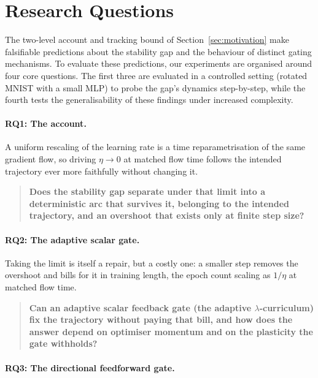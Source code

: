 \section{Research Questions}
\label{sec:research_questions}

The two-level account and tracking bound of Section~\ref{sec:motivation} make falsifiable predictions about the stability gap and the behaviour of distinct gating mechanisms. To evaluate these predictions, our experiments are organised around four core questions. The first three are evaluated in a controlled setting (rotated MNIST with a small MLP) to probe the gap's dynamics step-by-step, while the fourth tests the generalisability of these findings under increased complexity.

\paragraph{RQ1: The account.}
A uniform rescaling of the learning rate is a time reparametrisation of the same gradient flow, so driving $\eta \to 0$ at matched flow time follows the intended trajectory ever more faithfully without changing it.

\begin{quote}
    \textbf{Does the stability gap separate under that limit into a deterministic arc that survives it, belonging to the intended trajectory, and an overshoot that exists only at finite step size?}
\end{quote}

\paragraph{RQ2: The adaptive scalar gate.}
Taking the limit is itself a repair, but a costly one: a smaller step removes the overshoot and bills for it in training length, the epoch count scaling as $1/\eta$ at matched flow time.

\begin{quote}
    \textbf{Can an adaptive scalar feedback gate (the adaptive $\lambda$-curriculum) fix the trajectory without paying that bill, and how does the answer depend on optimiser momentum and on the plasticity the gate withholds?}
\end{quote}

\paragraph{RQ3: The directional feedforward gate.}

